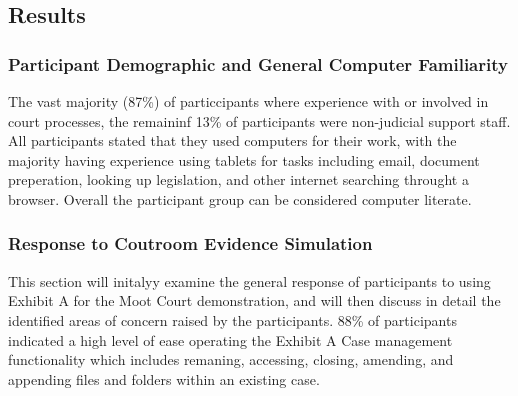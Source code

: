 \subsection{Results}
\subsubsection{Participant Demographic and General Computer Familiarity}
The vast majority (87\%) of particcipants where experience with or involved in court processes, the remaininf 13\% of participants were non-judicial support staff. All participants stated that they used computers for their work, with the majority having experience using tablets for tasks including email, document preperation, looking up legislation, and other internet searching throught a browser.
Overall the participant group can be considered computer literate.

\subsubsection{Response to Coutroom Evidence Simulation}
This section will initalyy examine the general response of participants to using Exhibit A for the Moot Court demonstration, and will then discuss in detail the identified areas of concern raised by the participants.
88\% of participants indicated a high level of ease operating the Exhibit A Case management functionality which includes remaning, accessing, closing, amending, and appending files and folders within an existing case. 

    







\begin{figure}[h] \centering

% 
\hspace{0.5cm}

\end{figure}



